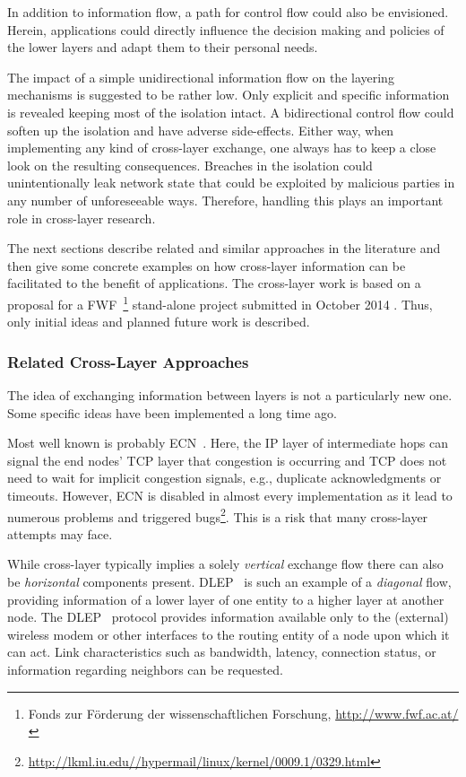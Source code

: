 In addition to information flow, a path for control flow could also be envisioned. Herein, applications could directly influence the decision making and policies of the lower layers and adapt them to their personal needs.

The impact of a simple unidirectional information flow on the layering mechanisms is suggested to be rather low. Only explicit and specific information is revealed keeping most of the isolation intact. A bidirectional control flow could soften up the isolation and have adverse side-effects. Either way, when implementing any kind of cross-layer exchange, one always has to keep a close look on the resulting consequences. Breaches in the isolation could unintentionally leak network state that could be exploited by malicious parties in any number of unforeseeable ways. Therefore, handling this plays an important role in cross-layer research.

The next sections describe related and similar approaches in the literature and then give some concrete examples on how cross-layer information can be facilitated to the benefit of applications. The cross-layer work is based on a proposal for a FWF~\footnote{Fonds zur Förderung der wissenschaftlichen Forschung, \url{http://www.fwf.ac.at/}} stand-alone project submitted in October 2014 . Thus, only initial ideas and planned future work is described.

\subsubsection{Related Cross-Layer Approaches}

The idea of exchanging information between layers is not a particularly new one. Some specific ideas have been implemented a long time ago.

Most well known is probably \gls{ECN}~\cite{rfc3168}. Here, the \gls{IP} layer of intermediate hops can signal the end nodes' \gls{TCP} layer that congestion is occurring and \gls{TCP} does not need to wait for implicit congestion signals, e.g., duplicate acknowledgments or timeouts. However, \gls{ECN} is disabled in almost every implementation as it lead to numerous problems and triggered bugs\footnote{\url{http://lkml.iu.edu//hypermail/linux/kernel/0009.1/0329.html}}. This is a risk that many cross-layer attempts may face.

While cross-layer typically implies a solely \textit{vertical} exchange flow there can also be \textit{horizontal} components present.
\gls{DLEP}~\cite{ietf2013dlepdraft} is such an example of a \textit{diagonal} flow, providing information of a lower layer of one entity to a higher layer at another node.
The \gls{DLEP}~\cite{ietf2013dlepdraft} protocol provides information available only to the (external) wireless modem or other interfaces to the routing entity of a node upon which it can act. Link characteristics such as bandwidth, latency, connection status, or information regarding neighbors can be requested.


